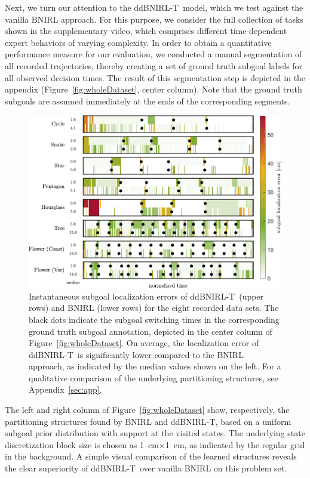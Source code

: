 \documentclass[twoside,11pt]{article}
\newcommand{\ddBNIRLT}{\mbox{ddBNIRL-T}}
\begin{document}
Next, we %
%
turn our attention to the \ddBNIRLT\  model, which we %
test against the vanilla BNIRL approach. %
For this purpose, we consider the full collection of tasks shown in the supplementary video,
%
which comprises %
different time-dependent expert behaviors of varying complexity.
In order to %
obtain a quantitative performance measure for our evaluation, we %
conducted a manual segmentation of all recorded trajectories, %
%
thereby creating a set of ground truth subgoal labels %
%
for all %
observed decision times. The result of this segmentation step 
%
is depicted in the appendix (Figure~\ref{fig:wholeDataset}, center column). Note that the %
ground truth subgoals are assumed %
immediately at the ends of the corresponding segments.
%

\begin{figure}[t]
	\centering
	\includegraphics[scale=1]{images/robotMetric/metric.pdf}
	\caption{Instantaneous subgoal localization errors of \ddBNIRLT\  (upper rows) and BNIRL (lower rows) for the eight %
recorded data sets. %
The black dots indicate the subgoal switching times in the corresponding ground truth subgoal annotation, depicted in the center column of Figure~\ref{fig:wholeDataset}. On average, the localization error of \ddBNIRLT\ is significantly lower compared to the BNIRL approach, as indicated by the median values shown on the left. For a qualitative comparison of the underlying partitioning structures, see Appendix~\ref{sec:app}.} %
	\label{fig:robotMetric}
\end{figure}

The left and right column of Figure~\ref{fig:wholeDataset} show, respectively, the partitioning structures found by BNIRL and ddBNIRL-T, %
based on a uniform subgoal prior distribution with support at the visited states. The underlying state discretization block size is chosen as \SI{1}{\centi\metre}$\times$\SI{1}{\centi\metre}, as indicated by the regular grid in the background. A simple visual comparison of the learned %
structures reveals the clear superiority of \ddBNIRLT\  over vanilla BNIRL on this problem set. %
%
\end{document}
